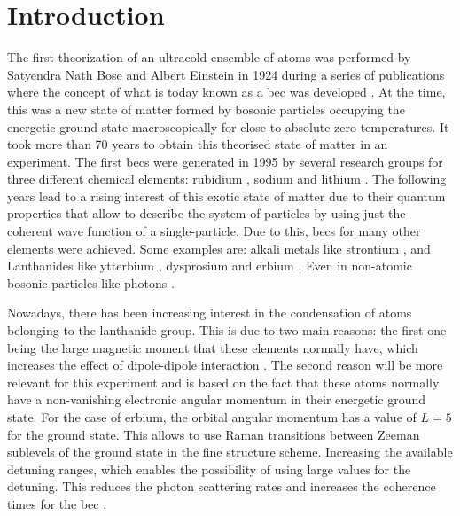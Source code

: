 
\chapter{Introduction}
\label{chap:intro}

The first theorization of an ultracold ensemble of atoms was performed by Satyendra Nath Bose and Albert Einstein in 1924 during a series of publications where the concept of what is today known as a \acf{bec} was developed \cite{Bose1924, Einstein1924, Einstein1925}. At the time, this was a new state of matter formed by bosonic particles occupying the energetic ground state macroscopically for close to absolute zero temperatures. It took more than 70 years to obtain this theorised state of matter in an experiment. The first \acp{bec} were generated in 1995 by several research groups for three different chemical elements: rubidium \cite{Davis1995}, sodium \cite{Anderson1995} and lithium \cite{Bradley1995}. The following years lead to a rising interest of this exotic state of matter due to their quantum properties that allow to describe the system of particles by using just the coherent wave function of a single-particle. Due to this, \acp{bec} for many other elements were achieved. Some examples are: alkali metals like strontium \cite{Stellmer2009}, and Lanthanides like ytterbium \cite{Takasu2003}, dysprosium \cite{Lu2011} and erbium \cite{Aikawa2012}. Even in non-atomic bosonic particles like photons \cite{Klaers2010}.

Nowadays, there has been increasing interest in the condensation of atoms belonging to the lanthanide group. This is due to two main reasons: the first one being the large magnetic moment that these elements normally have, which increases the effect of dipole-dipole interaction \cite{Aikawa2012,Baier2018}. The second reason will be more relevant for this experiment and is based on the fact that these atoms normally have a non-vanishing electronic angular momentum in their energetic ground state. For the case of erbium, the orbital angular momentum has a value of $L=5$ for the ground state. This allows to use Raman transitions between Zeeman sublevels of the ground state in the fine structure scheme. Increasing the available detuning ranges, which enables the possibility of using large values for the detuning. This reduces the photon scattering rates and increases the coherence times for the \ac{bec} \cite{Grimm2000}.

